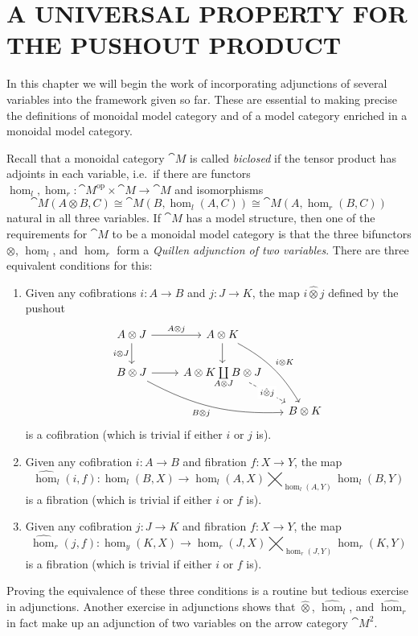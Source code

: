 
\chapter{A UNIVERSAL PROPERTY FOR THE PUSHOUT PRODUCT}\label{Ch:PushoutProduct} 

In this chapter we will begin the work of incorporating adjunctions of several variables into the framework given so far. These are essential to making precise the definitions of monoidal model category and of a model category enriched in a monoidal model category.

Recall that a monoidal category $\cat{M}$ is called \emph{biclosed} if the tensor product has adjoints in each variable, i.e.~if there are functors
$\hom_l,\hom_r\colon\cat{M}^{\text{op}}\times\cat{M}\to\cat{M}$ and isomorphisms
\[
	\cat{M}(A\otimes B,C) \cong \cat{M}(B,\hom_l(A,C)) \cong \cat{M}(A,\hom_r(B,C))
\]
natural in all three variables. If $\cat{M}$ has a model structure, then one of the requirements for $\cat{M}$ to be a monoidal model category is that the three bifunctors $\otimes$, $\hom_l$, and $\hom_r$ form a \emph{Quillen adjunction of two variables}. There are three equivalent conditions for this:
\begin{enumerate}
	\item Given any cofibrations $i\colon A\to B$ and $j\colon J\to K$, the map $i\hat{\otimes}j$ defined by the pushout
	\[
	\begin{tikzcd}[bend angle=15]
		A\otimes J \rar{A\otimes j} \dar[swap]{i\otimes J}
			& A\otimes K \dar \ar[bend left]{ddr}{i\otimes K} &[-2ex] \\
		B\otimes J \rar \ar[bend right]{drr}[swap]{B\otimes j}
			& A\otimes K \!\underset{A\otimes J}{\coprod}\!B\otimes J 
				\drar[dashed,start anchor={[xshift=-3ex,yshift=2ex]}][description]{i\hat{\otimes}j} & \\[-2ex]
		& & B\otimes K
	\end{tikzcd}
	\]
	is a cofibration (which is trivial if either $i$ or $j$ is).
	\item Given any cofibration $i\colon A\to B$ and fibration $f\colon X\to Y$, the map
	\[
		\hat{\hom}_l(i,f)\colon \hom_l(B,X) \to \hom_l(A,X)\!\!\!\!\bigtimes_{\hom_l(A,Y)}\!\!\!\!\hom_l(B,Y)
	\]
	is a fibration (which is trivial if either $i$ or $f$ is).
	\item Given any cofibration $j\colon J\to K$ and fibration $f\colon X\to Y$, the map
	\[
		\hat{\hom}_r(j,f)\colon \hom_y(K,X) \to \hom_r(J,X)\!\!\!\!\bigtimes_{\hom_r(J,Y)}\!\!\!\!\hom_r(K,Y)
	\]
	is a fibration (which is trivial if either $i$ or $f$ is).
\end{enumerate}
Proving the equivalence of these three conditions is a routine but tedious exercise in adjunctions. Another exercise in adjunctions shows that $\hat{\otimes}$, $\hat{\hom}_l$, and $\hat{\hom}_r$ in fact make up an adjunction of two variables on the arrow category $\cat{M}^2$.

